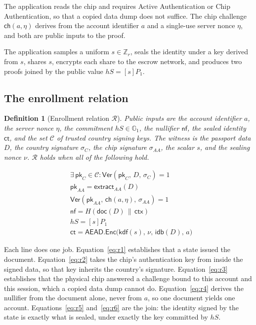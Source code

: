\documentclass[11pt,a4paper]{article}
\newtheorem{definition}{Definition}
\begin{document}
The application reads the chip and requires Active Authentication or Chip
Authentication, so that a copied data dump does not suffice. The chip challenge
$\mathsf{ch}(a,\eta)$ derives from the account identifier $a$ and a single-use
server nonce $\eta$, and both are public inputs to the proof.

The application samples a uniform $s \in \mathbb{Z}_r$, seals the identity under
a key derived from $s$, shares $s$, encrypts each share to the escrow network,
and produces two proofs joined by the public value $hS = [s]P_1$.

\subsection{The enrollment relation}
\label{sec:relation}

\begin{definition}[Enrollment relation $\mathcal{R}$]
Public inputs are the account identifier $a$, the server nonce $\eta$, the
commitment $hS \in \mathbb{G}_1$, the nullifier $\mathsf{nf}$, the sealed
identity $\mathsf{ct}$, and the set $\mathcal{C}$ of trusted country signing
keys. The witness is the passport data $D$, the country signature $\sigma_C$,
the chip signature $\sigma_{AA}$, the scalar $s$, and the sealing nonce $\nu$.
$\mathcal{R}$ holds when all of the following hold.
\end{definition}

\begin{align}
&\exists\, \mathsf{pk}_C \in \mathcal{C} :
  \mathsf{Ver}(\mathsf{pk}_C,\, D,\, \sigma_C) = 1 \label{eq:r1}\\
&\mathsf{pk}_{AA} = \mathsf{extract}_{AA}(D) \label{eq:r2}\\
&\mathsf{Ver}(\mathsf{pk}_{AA},\, \mathsf{ch}(a,\eta),\, \sigma_{AA}) = 1
  \label{eq:r3}\\
&\mathsf{nf} = H(\mathsf{doc}(D) \,\|\, \mathsf{ctx}) \label{eq:r4}\\
&hS = [s]P_1 \label{eq:r5}\\
&\mathsf{ct} = \mathsf{AEAD.Enc}\big(\mathsf{kdf}(s),\, \nu,\,
  \mathsf{idb}(D),\, a\big) \label{eq:r6}
\end{align}

Each line does one job. Equation~\ref{eq:r1} establishes that a state issued the
document. Equation~\ref{eq:r2} takes the chip's authentication key from inside
the signed data, so that key inherits the country's signature.
Equation~\ref{eq:r3} establishes that the physical chip answered a challenge
bound to this account and this session, which a copied data dump cannot do.
Equation~\ref{eq:r4} derives the nullifier from the document alone, never from
$a$, so one document yields one account. Equations~\ref{eq:r5}
and~\ref{eq:r6} are the join: the identity signed by the state is exactly what is
sealed, under exactly the key committed by $hS$.
\end{document}
